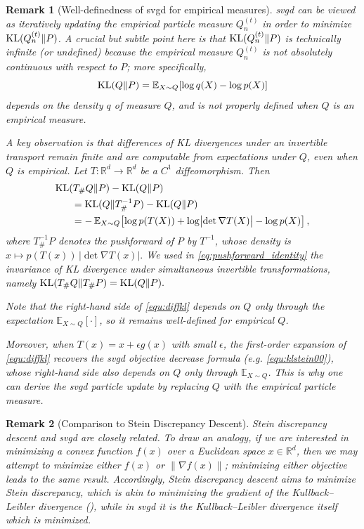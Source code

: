 \documentclass[12pt,paper=letter]{scrreprt}
\newtheorem{remark}{Remark}[chapter]
\def\mbb#1{\mathbb{#1}}
\def\R{\mathbb{R}}
\def\E{\mbb{E}} %
\def\KL#1#2{\textnormal{KL}({#1}\Vert{#2})}
\begin{document}
\begin{remark}[Well-definedness of \ac{svgd} for empirical measures] 
\ac{svgd} can be viewed as iteratively updating the empirical particle measure $Q_n^{(t)}$ in order to minimize $\KL{Q_n^{(t)}}{P}$. A crucial but subtle point here is that $\KL{Q_n^{(t)}}{P}$ is technically infinite (or undefined) because the empirical measure $Q_n^{(t)}$ is not absolutely continuous with respect to $P$; more specifically, $$ \KL{Q}{P} = \E_{X\sim Q} [ \log q(X) - \log p(X)]$$
depends on the density $q$ of measure $Q$, and is not properly defined when $Q$ is an empirical measure. 


A key observation is that \emph{differences} of KL divergences under an invertible transport
remain finite and are computable from expectations under $Q$, even when $Q$ is empirical.
Let $T:\R^d\to\R^d$ be a $C^1$ diffeomorphism. Then
\begin{align}
& \KL{T_\# Q}{P} - \KL{Q}{P}\notag\\ 
&~~~~~= \KL{Q}{T^{-1}_\# P} - \KL{Q}{P} \label{eq:pushforward_identity}\\
&~~~~~=  -\,\E_{X\sim Q}\!\left[\log p(T(X)) + \log\bigl|\det \nabla T(X)\bigr| - \log p(X)\right], \label{equ:diffkl} 
\end{align}
where $T^{-1}_\#P$ denotes the pushforward of $P$ by $T^{-1}$, whose density is
$
x \mapsto p(T(x))\,\bigl|\det \nabla T(x)\bigr|. 
$ 
We used in \eqref{eq:pushforward_identity} the invariance of KL divergence
under simultaneous invertible transformations, namely  
$\KL{T_\# Q}{T_\# P} = \KL{Q}{P}.$ 

Note that the right-hand side of \eqref{equ:diffkl} depends on $Q$ only through the expectation $\E_{X\sim Q}[\cdot]$,
so it remains well-defined for empirical $Q$.

Moreover, when $T(x)=x+\epsilon g(x)$ with small $\epsilon$, the first-order expansion of
\eqref{equ:diffkl} recovers the \ac{svgd} objective decrease formula (e.g. \eqref{equ:klstein00}),
whose right-hand side also depends on $Q$ only through $\E_{X\sim Q}$.
This is why one can derive the \ac{svgd} particle update by replacing $Q$ with the empirical
particle measure.
\end{remark}


\begin{remark}[Comparison to Stein Discrepancy Descent]
    Stein discrepancy descent and \ac{svgd} are closely related.
    To draw an analogy, if we are interested in minimizing a convex function $f(x)$ over a Euclidean space $x \in \mathbb{R}^d$, then we may attempt to minimize either $f(x)$ or $\|\nabla f(x)\|$; minimizing either objective leads to the same result.
    Accordingly, Stein discrepancy descent aims to minimize Stein discrepancy, which is akin to minimizing the gradient of the Kullback--Leibler divergence (), while in \ac{svgd} it is the Kullback--Leibler divergence itself which is minimized.
\end{remark}
 
\end{document}
